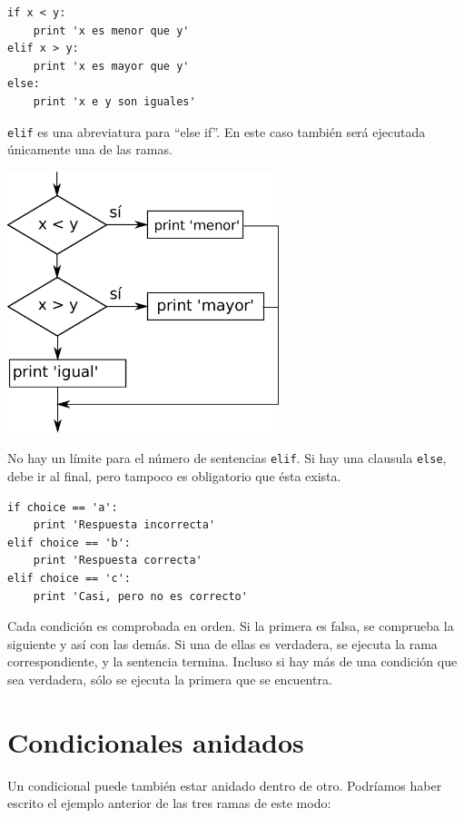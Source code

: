 \beforeverb
\begin{verbatim}
if x < y:
    print 'x es menor que y'
elif x > y:
    print 'x es mayor que y'
else:
    print 'x e y son iguales'
\end{verbatim}
\afterverb
%
{\tt elif} es una abreviatura para ``else if''.  En este caso también
será ejecutada únicamente una de las ramas.

\beforefig
\centerline{\includegraphics[height=3.00in]{figs2/elif.eps}}
\afterfig

No hay un límite para el número de sentencias
{\tt elif}. Si hay una clausula {\tt else}, debe ir
al final, pero tampoco es obligatorio que ésta exista.



\beforeverb
\begin{verbatim}
if choice == 'a':
    print 'Respuesta incorrecta'
elif choice == 'b':
    print 'Respuesta correcta'
elif choice == 'c':
    print 'Casi, pero no es correcto'
\end{verbatim}
\afterverb
%
Cada condición es comprobada en orden. Si la primera es falsa,
se comprueba la siguiente y así con las demás. Si una de ellas es
verdadera, se ejecuta la rama correspondiente, y la sentencia
termina. Incluso si hay más de una condición que sea verdadera, sólo se
ejecuta la primera que se encuentra.

\section{Condicionales anidados}

Un condicional puede también estar anidado dentro de otro. Podríamos
haber escrito el ejemplo anterior de las tres ramas de este modo:

